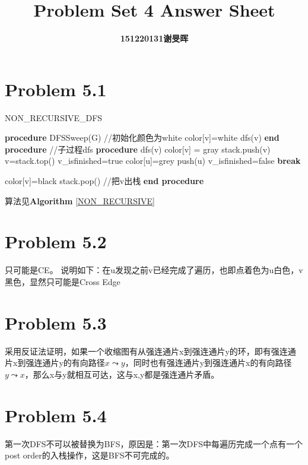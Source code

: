 \documentclass[twocolumn]{ctexart}
\begin{document}
	\title{Problem Set 4 Answer Sheet}
	\author{\textbf{151220131谢旻晖}}
	\date{}
	\maketitle
	
\section*{Problem 5.1}
\begin{algorithm}
	\caption{NON\_RECURSIVE\_DFS}
	\label{NON_RECURSIVE}
	\begin{algorithmic}[1]
		\STATE \textbf{procedure} DFSSweep(G)
		\STATE //初始化颜色为white
			\STATE color[v]=white
		\ENDFOR
			\STATE dfs(v)
		\ENDIF
		\ENDFOR
		\STATE \textbf{end procedure}
		\STATE  
		\STATE  //子过程dfs
		\STATE \textbf{procedure} dfs(v)
			\STATE color[v] = gray
			\STATE stack.push(v)
				\STATE	v=stack.top()
				\STATE v\_isfinished=true
						\STATE color[u]=grey
						\STATE push(u)
						\STATE v\_isfinished=false
						\STATE \textbf{break}
					\ENDIF
					
					\IF{v\_isfinished}
						\STATE color[v]=black
						\STATE stack.pop() //把v出栈
					\ENDIF
				\ENDFOR
			\ENDWHILE
		\STATE \textbf{end procedure}		
	\end{algorithmic}
\end{algorithm}
\indent 算法见\textbf{Algorithm }\ref{NON_RECURSIVE}

\section*{Problem 5.2}
\indent 只可能是CE。
\indent 说明如下：在u发现之前v已经完成了遍历，也即点着色为u白色，v黑色，显然只可能是Cross Edge

\section*{Problem 5.3}
\indent 采用反证法证明，如果一个收缩图有从强连通片x到强连通片y的环，即有强连通片x到强连通片y的有向路径$x \leadsto y$，同时也有强连通片y到强连通片x的有向路径$y \leadsto x$，那么x与y就相互可达，这与x,y都是强连通片矛盾。


\section*{Problem 5.4}
\indent 第一次DFS不可以被替换为BFS，原因是：第一次DFS中每遍历完成一个点有一个post order的入栈操作，这是BFS不可完成的。\\
\end{document}
